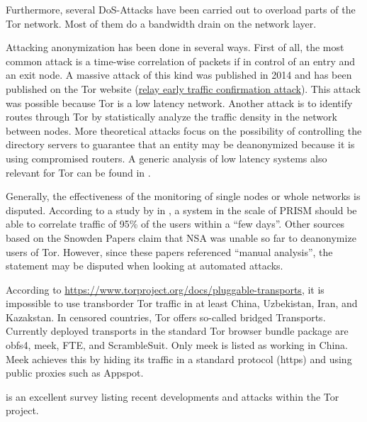 Furthermore, several DoS-Attacks have been carried out to overload parts of the Tor network. Most of them do a bandwidth drain on the network layer.

Attacking anonymization has been done in several ways. First of all, the most common attack is a time-wise correlation of packets if in control of an entry and an exit node. A massive attack of this kind was published in 2014 and has been published on the Tor website (\href{https://blog.torproject.org/blog/tor-security-advisory-relay-early-traffic-confirmation-attack}{relay early traffic confirmation attack}). This attack was possible because Tor is a low latency network. Another attack is to identify routes through Tor by statistically analyze the traffic density in the network between nodes. More theoretical attacks focus on the possibility of controlling the directory servers to guarantee that an entity may be deanonymized because it is using compromised routers. A generic analysis of low latency systems also relevant for Tor can be found in \cite{johnson2009design}.

Generally, the effectiveness of the monitoring of single nodes or whole networks is disputed. According to a study by \citeauthor{ccs2013-usersrouted} in \citeyear{ccs2013-usersrouted}\cite{ccs2013-usersrouted}, a system in the scale of PRISM should be able to correlate traffic of 95\% of the users within a ``few days''. Other sources based on the Snowden Papers claim that NSA was unable so far to deanonymize users of  Tor. However, since these papers referenced ``manual analysis'', the statement may be disputed when looking at automated attacks.

According to \url{https://www.torproject.org/docs/pluggable-transports}, it is impossible to use transborder Tor traffic in at least China, Uzbekistan, Iran, and Kazakstan. In censored countries, Tor offers so-called bridged Transports. Currently deployed transports in the standard Tor browser bundle package are obfs4, meek, FTE, and ScrambleSuit. Only meek is listed as working in China. Meek achieves this by hiding its traffic in a standard protocol (https) and using public proxies such as Appspot.

\cite{saleh2018shedding} is an excellent survey listing recent developments and attacks within the Tor project.

